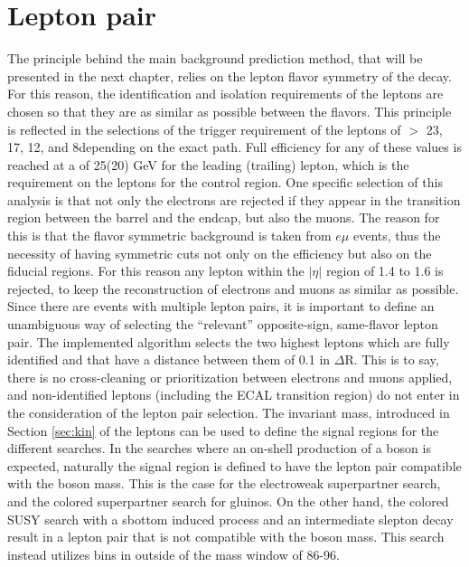 \section{Lepton pair}\label{sec:lepSelection}
\noindent\justify
The principle behind the main background prediction method, that will be presented in the next chapter, relies on the lepton flavor symmetry of the \PW decay.
For this reason, the identification and isolation requirements of the leptons are chosen so that they are as similar as possible between the flavors. 
This principle is reflected in the selections of the trigger requirement of the leptons of \pt $>$ 23, 17, 12, and 8\GeV depending on the exact path. 
Full efficiency for any of these values is reached at a \pt of 25(20) GeV for the leading (trailing) lepton, which is the requirement on the leptons for the control region. 
One specific selection of this analysis is that not only the electrons are rejected if they appear in the transition region between the barrel and the endcap, but also the muons. 
The reason for this is that the flavor symmetric background is taken from $e\mu$ events, thus the necessity of having symmetric cuts not only on the efficiency but also on the fiducial regions. 
For this reason any lepton within the $|\eta|$ region of 1.4 to 1.6 is rejected, to keep the reconstruction of electrons and muons as similar as possible. 
\newpara
\noindent\justify
Since there are events with multiple lepton pairs, it is important to define an unambiguous way of selecting the ``relevant''  opposite-sign, same-flavor lepton pair. 
The implemented algorithm selects the two highest \pt leptons which are fully identified and that have a distance between them of 0.1 in $\Delta$R. 
This is to say, there is no cross-cleaning or prioritization between electrons and muons applied, and non-identified leptons (including the ECAL transition region) do not enter in the consideration of the lepton pair selection. 
\newpara
\noindent\justify
The invariant mass, introduced in Section \ref{sec:kin} of the leptons can be used to define the signal regions for the different searches. 
In the searches where an on-shell production of a \PZ boson is expected, naturally the signal region is defined to have the lepton pair compatible with the \PZ boson mass.  
This is the case for the electroweak superpartner search, and the colored superpartner search for gluinos. 
On the other hand, the colored SUSY search with a sbottom induced process and an intermediate slepton decay result in a lepton pair that is not compatible with the \PZ boson mass. 
This search instead utilizes bins in \mll outside of the \PZ mass window of 86-96\GeV. 
